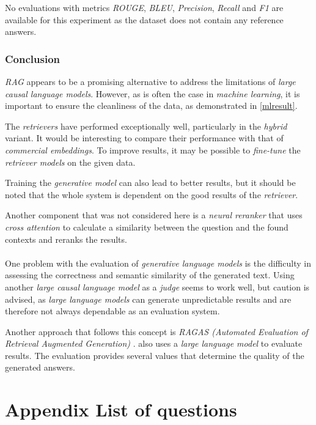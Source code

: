 \documentclass{article}
\begin{document}
No evaluations with metrics \textit{ROUGE}, \textit{BLEU}, \textit{Precision}, \textit{Recall} and \textit{F1} are available for this experiment as the dataset does not contain any reference answers.

\subsubsection{Conclusion}
\textit{RAG} appears to be a promising alternative to address the limitations of \textit{large causal language models}. However, as is often the case in \textit{machine learning}, it is important to ensure the cleanliness of the data, as demonstrated in \cref{mlresult}. 

The \textit{retrievers} have performed exceptionally well, particularly in the \textit{hybrid} variant. It would be interesting to compare their performance with that of \textit{commercial embeddings}. To improve results, it may be possible to \textit{fine-tune} the \textit{retriever models} on the given data.

Training the \textit{generative model} can also lead to better results, but it should be noted that the whole system is dependent on the good results of the \textit{retriever}. 

Another component that was not considered here is a \textit{neural reranker} that uses \textit{cross attention} to calculate a similarity between the question and the found contexts and reranks the results.\\
\\
One problem with the evaluation of \textit{generative language models} is the difficulty in assessing the correctness and semantic similarity of the generated text. Using another \textit{large causal language model} as a \textit{judge} seems to work well, but caution is advised, as \textit{large language models} can generate unpredictable results and are therefore not always dependable as an evaluation system. 

Another approach that follows this concept is \textit{RAGAS (Automated Evaluation of Retrieval Augmented Generation)} \cite{ragas}. \cite{ragas} also uses a \textit{large language model} to evaluate results. The evaluation provides several values that determine the quality of the generated answers.

\newpage

\newpage

\appendix
\section{Appendix List of questions}\label{appendix_a}

\newpage
%

\newpage


\end{document}
